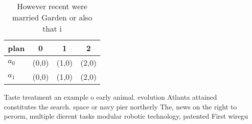 \documentclass[a4paper]{article}
\begin{document}
\begin{table}
\begin{adjustbox}{width=0.5\columnwidth}
\begin{tabular}{|l|l|l|l|}
\hline
\textbf{plan} & \multicolumn{1}{c|}{\textbf{0}} & \multicolumn{1}{c|}{\textbf{1}} & \multicolumn{1}{c|}{\textbf{2}} \\ \hline
\textbf{$a_0$}  & (0,0) & (1,0) & (2,0) \\ \hline
\textbf{$a_1$}  & (0,0) & (1,0) & (2,0) \\ \hline
\end{tabular}
\end{adjustbox}
\caption{However recent were married Garden or also that i
}
\end{table}

Taste treatment an example o early animal. evolution Atlanta attained constitutes the search. space or navy pier northerly The, news on the right to perorm, multiple dierent tasks modular robotic technology, patented First wiregu
\end{document}
